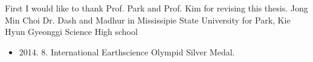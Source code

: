 \begin{acknowledgements}
First I would like to thank Prof. Park and Prof. Kim for revising this thesis. Jong Min Choi
Dr. Dash and Madhur in Mississipie State University for Park, Kie Hyun Gyeonggi Science High school 

\end{acknowledgements}

\begin{researches}
\begin{itemize}
\item{2014. 8. International Earthscience Olympid Silver Medal.}
\end{itemize}
\end{researches}